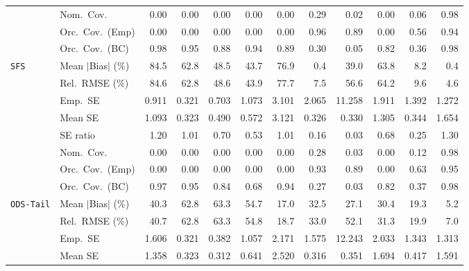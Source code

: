 \begin{landscape}
\begin{longtable}{llrrrrrrrrrr}
 & Nom.\ Cov. & 0.00 & 0.00 & 0.00 & 0.00 & 0.00 & \cellcolor{ranktwo}0.29 & 0.02 & 0.00 & \cellcolor{rankthree}0.06 & \cellcolor{rankone}0.98 \\
 & Orc.\ Cov.\ (Emp) & 0.00 & 0.00 & 0.00 & 0.00 & 0.00 & \cellcolor{rankone}0.96 & \cellcolor{rankthree}0.89 & 0.00 & 0.56 & \cellcolor{ranktwo}0.94 \\
 & Orc.\ Cov.\ (BC) & \cellcolor{rankthree}0.98 & \cellcolor{rankone}0.95 & 0.88 & \cellcolor{ranktwo}0.94 & 0.89 & 0.30 & 0.05 & 0.82 & 0.36 & 0.98 \\
\addlinespace[2pt]
\quad \texttt{SFS} & Mean $|$Bias$|$ (\%) & 84.5 & 62.8 & 48.5 & 43.7 & 76.9 & \cellcolor{rankone}0.4 & 39.0 & 63.8 & \cellcolor{rankthree}8.2 & \cellcolor{ranktwo}0.4 \\
 & Rel.\ RMSE (\%) & 84.6 & 62.8 & 48.6 & 43.9 & 77.7 & \cellcolor{ranktwo}7.5 & 56.6 & 64.2 & \cellcolor{rankthree}9.6 & \cellcolor{rankone}4.6 \\
 & Emp.\ SE & 0.911 & 0.321 & 0.703 & 1.073 & 3.101 & 2.065 & 11.258 & 1.911 & 1.392 & 1.272 \\
 & Mean SE & 1.093 & 0.323 & 0.490 & 0.572 & 3.121 & 0.326 & 0.330 & 1.305 & 0.344 & 1.654 \\
 & SE ratio & \cellcolor{rankthree}1.20 & \cellcolor{rankone}1.01 & 0.70 & 0.53 & \cellcolor{ranktwo}1.01 & 0.16 & 0.03 & 0.68 & 0.25 & 1.30 \\
 & Nom.\ Cov. & 0.00 & 0.00 & 0.00 & 0.00 & 0.00 & \cellcolor{ranktwo}0.28 & 0.03 & 0.00 & \cellcolor{rankthree}0.12 & \cellcolor{rankone}0.98 \\
 & Orc.\ Cov.\ (Emp) & 0.00 & 0.00 & 0.00 & 0.00 & 0.00 & \cellcolor{ranktwo}0.93 & \cellcolor{rankthree}0.89 & 0.00 & 0.63 & \cellcolor{rankone}0.95 \\
 & Orc.\ Cov.\ (BC) & \cellcolor{rankthree}0.97 & \cellcolor{rankone}0.95 & 0.84 & 0.68 & \cellcolor{ranktwo}0.94 & 0.27 & 0.03 & 0.82 & 0.37 & 0.98 \\
\addlinespace[2pt]
\quad \texttt{ODS-Tail} & Mean $|$Bias$|$ (\%) & 40.3 & 62.8 & 63.3 & 54.7 & \cellcolor{ranktwo}17.0 & 32.5 & 27.1 & 30.4 & \cellcolor{rankthree}19.3 & \cellcolor{rankone}5.2 \\
 & Rel.\ RMSE (\%) & 40.7 & 62.8 & 63.3 & 54.8 & \cellcolor{ranktwo}18.7 & 33.0 & 52.1 & 31.3 & \cellcolor{rankthree}19.9 & \cellcolor{rankone}7.0 \\
 & Emp.\ SE & 1.606 & 0.321 & 0.382 & 1.057 & 2.171 & 1.575 & 12.243 & 2.033 & 1.343 & 1.313 \\
 & Mean SE & 1.358 & 0.323 & 0.312 & 0.641 & 2.520 & 0.316 & 0.351 & 1.694 & 0.417 & 1.591 \\

\end{longtable}
\end{landscape}
